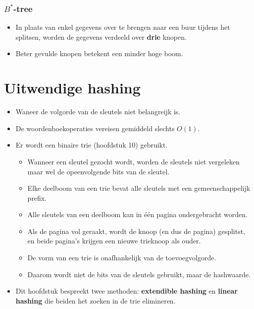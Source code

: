 \subsubsection{$B^*$-tree}
\begin{itemize}
    \item In plaats van enkel gegevens over te brengen naar een buur tijdens het splitsen, worden de gegevens verdeeld over \textbf{drie} knopen.
    \item Beter gevulde knopen betekent een minder hoge boom.
\end{itemize}
\section{Uitwendige hashing}
\begin{itemize}
    \item Waneer de volgorde van de sleutels niet belangreijk is.
    \item De woordenboekoperaties vereisen gemiddeld slechts $O(1)$.
    \item Er wordt een binaire trie (hoofdstuk 10) gebruikt.
    \begin{itemize}
        \item Wanneer een sleutel gezocht wordt, worden de sleutels niet vergeleken maar wel de opeenvolgende bits van de sleutel.
        \item Elke deelboom van een trie bevat alle sleutels met een gemeenschappelijk prefix.
        \item Alle sleutels van een deelboom kan in één pagina ondergebracht worden.
        \item Als de pagina vol geraakt, wordt de knoop (en dus de pagina) gesplitst, en beide pagina's krijgen een nieuwe trieknoop als ouder.
        \item De vorm van een trie is onafhankelijk van de toevoegvolgorde.
        \item Daarom wordt niet de bits van de sleutels gebruikt, maar de hashwaarde.
    \end{itemize}
    \item Dit hoofdstuk bespreekt twee methoden: \textbf{extendible hashing} en \textbf{linear hashing} die beiden het zoeken in de trie elimineren.

\end{itemize}


